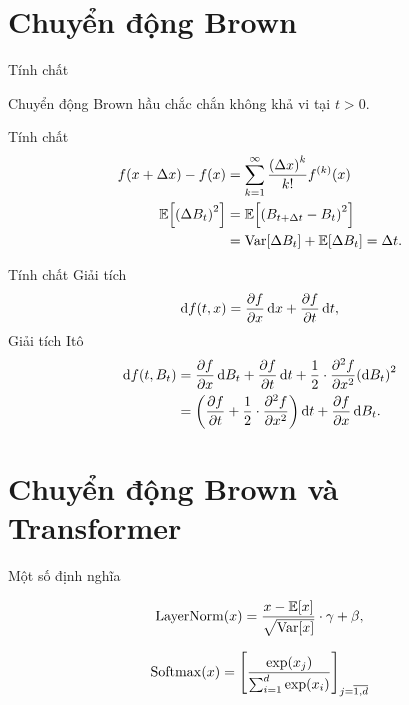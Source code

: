 \documentclass[tocsection,footlinesection,aspectratio=169,mathserif]{beamer}
\newcommand{\citef}[1]{\cite{#1}\ffcite{#1}}
\begin{document}
\section{Chuyển động Brown}
\begin{frame}{Tính chất}
	\begin{prop}\label{prop:nowhere-diff-brown}
		Chuyển động Brown hầu chắc chắn không khả vi
		tại $t>0$\citef{S096:17}.
	\end{prop}
\end{frame}


\begin{frame}{Tính chất}
	\begin{align}
		f\left(x+\Delta x\right)-f\left(x\right)      & =\sum_{k=1}^{\infty}\frac{\left(\Delta x\right)^{k}}{k!}f^{\left(k\right)}\left(x\right) \\
		\Ex\left[\left(\Delta B_{t}\right)^{2}\right] & =\Ex\left[\left(B_{t+\Delta t}-B_{t}\right)^{2}\right]                                   \\
		                                              & =\Var\left[\Delta B_{t}\right]+\Ex\left[\Delta B_{t}\right]=\Delta t.
	\end{align}
\end{frame}

\begin{frame}{Tính chất}
	Giải tích
	\begin{align}
		\D f\left(t,x\right)=\frac{\partial f}{\partial x}\D x+\frac{\partial f}{\partial t}\D t,
	\end{align}
	Giải tích Itô
	\begin{align}
		\D f\left(t,B_{t}\right) & =\frac{\partial f}{\partial x}\D B_{t}+\frac{\partial f}{\partial t}\D t+\frac{1}{2}\cdot\frac{\partial^{2}f}{\partial x^{2}}\left(\D B_{t}\right)^{2} \nonumber \\
		                         & =\left(\frac{\partial f}{\partial t}+\frac{1}{2}\cdot\frac{\partial^{2}f}{\partial x^{2}}\right)\D t+\frac{\partial f}{\partial x}\D B_{t}.\label{eq:ito-diff}
	\end{align}
\end{frame}

\section{Chuyển động Brown và Transformer}

\begin{frame}{Một số định nghĩa}
	\begin{defn}
		\begin{equation}
			\LayerNorm\left(x\right)=\frac{x-\Ex\left[x\right]}{\sqrt{\Var\left[x\right]}}\cdot\gamma+\beta,
		\end{equation}
	\end{defn}

	\begin{defn}[Softmax]
		\begin{equation}
			\Softmax\left(x\right)=\left[\frac{\exp\left(x_{j}\right)}{\sum_{i=1}^{d}\exp\left(x_{i}\right)}\right]_{j=\overline{1,d}}
		\end{equation}
	\end{defn}
\end{frame}
\end{document}
